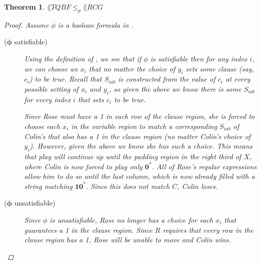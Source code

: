 \documentclass{article}
\newcommand{\0}{\mathbf{0}}
\newcommand{\1}{\mathbf{1}}
\newcommand{\2}{\mathbf{2}}
\newcommand{\TQBF}{\lang{TQBF}}
\newcommand{\RCG}{\lang{RCG}}
\newcommand{\bs}[1]{\boldsymbol{#1}}
\theoremstyle{plain}
\newtheorem{theorem}{Theorem}[section]
\theoremstyle{definition}
\newcounter{row}
\newcounter{col}
\begin{document}
\begin{theorem}$\TQBF \le_p \RCG$
\begin{proof}
  Assume $\phi$ is a boolean formula in \TQBF.
  \begin{description}
    \item[($\bs{\phi}$ satisfiable)]
      Using the definition of \TQBF, we see that if $\phi$ is
      satisfiable then for any index $i$, we can choose an $x_i$ that
      no matter the choice of $y_i$ sets some clause (say, $c_i$) to
      be true. Recall that $S_{iab}$ is constructed from the value of
      $c_i$ at every possible setting of $x_i$ and $y_i$, so given the
      above we know there is some $S_{iab}$ for every index $i$ that
      sets $c_i$ to be true.

      Since Rose must have a 1 in each row of the clause region, she
      is forced to choose each $x_i$ in the variable region to match a
      corresponding $S_{iab}$ of Colin's that also has a 1 in the clause
      region (no matter Colin's choice of $y_i$). However, given the
      above we know she has such a choice. This means that play will
      continue up until the padding region in the right third of $X$,
      where Colin is now forced to play only $\bs{0}^*$. All of Rose's
      regular expressions allow him to do so until the last column,
      which is now already filled with a string matching
      $\bs{1}\bs{0}^*$. Since this does not match $C$, Colin loses.
    \item[($\bs{\phi}$ unsatisfiable)]
      Since $\phi$ is unsatisfiable, Rose no longer has a choice for
      each $x_i$ that guarantees a 1 in the clause region. Since $R$
      requires that every row in the clause region has a 1, Rose will
      be unable to move and Colin wins.
  \end{description}
\end{proof}
\end{theorem}
\end{document}
